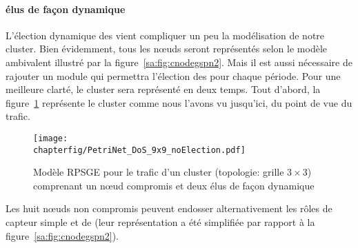            \paragraph{\cns élus de façon dynamique}
L'élection dynamique des \cns vient compliquer un peu la modélisation de notre cluster.
Bien évidemment, tous les nœuds seront représentés selon le modèle ambivalent illustré par la figure~\ref{sa:fig:cnodegspn2}.
Mais il est aussi nécessaire de rajouter un module qui permettra l'élection des \cns pour chaque période.
Pour une meilleure clarté, le cluster sera représenté en deux temps.
Tout d'abord, la figure~\ref{sa:fig:petridyn} représente le cluster comme nous l'avons vu jusqu'ici, du point de vue du trafic.
\begin{figure}[ht]
    \centering
    \texttt{[image: \\chapterfig/PetriNet\_DoS\_9x9\_noElection.pdf]}
    \caption{Modèle RPSGE pour le trafic d'un cluster (topologie: grille $3\times3$) comprenant un nœud compromis et deux \cns élus de façon dynamique}\label{sa:fig:petridyn}
\end{figure}
Les huit nœuds non compromis peuvent endosser alternativement les rôles de capteur simple et de \cn (leur représentation a été simplifiée par rapport à la figure~\ref{sa:fig:cnodegspn2}).

